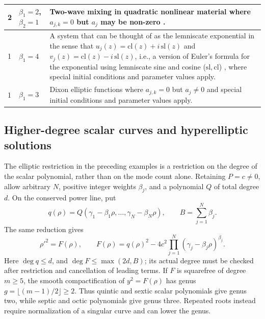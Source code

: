 \documentclass[11pt,a4paper]{article}
\numberwithin{equation}{section}
\begin{document}
\begin{center}
\begin{tabularx}{\textwidth}{|L{0.03\textwidth}|L{0.22\textwidth}|Y|}
         & $\beta_1=2$, $\beta_2=1$ & Two-wave mixing in quadratic nonlinear material where $a_{j,k}=0$ but $a_j$ may be non-zero \cite{heskethGeneralComplexEnvelope2015,armstrongInteractionsLightWaves1962}. \\
         & $\beta_1=4$& A system that can be thought of as the lemniscate exponential in the sense that $u_j(z)=\mathrm{cl}(z) + i\,\mathrm{sl}(z)$ and $v_j(z)=\mathrm{cl}(z) - i\,\mathrm{sl}(z)$, i.e., a version of Euler's formula for the exponential using lemniscate sine and cosine ($\mathrm{sl}, \mathrm{cl}$) \cite{whittakerCourseModernAnalysis2021}, where special initial conditions and parameter values apply. \\
         & $\beta_1=3$& Dixon elliptic functions \cite{zotero-item-852} where $a_{j,k}=0$ but $a_j\ne0$ and special initial conditions and parameter values apply. \\
        \hline
    \end{tabularx}
\end{center}

\subsection{Higher-degree scalar curves and hyperelliptic solutions}
\label{sec:hyperelliptic-examples}

The elliptic restriction in the preceding examples is a restriction on the degree of the scalar polynomial, rather than on the mode count alone. Retaining $P=c\ne0$, allow arbitrary $N$, positive integer weights $\beta_j$, and a polynomial $Q$ of total degree $d$. On the conserved power line, put
\begin{equation}
    q(\rho)=Q(\gamma_1-\beta_1\rho,\ldots,\gamma_N-\beta_N\rho),
    \qquad B=\sum_{j=1}^{N}\beta_j.
\end{equation}
The same reduction gives
\begin{equation}
    \rho'^2=F(\rho),\qquad
    F(\rho)=q(\rho)^2-4c^2\prod_{j=1}^{N}(\gamma_j-\beta_j\rho)^{\beta_j}.
    \label{eq:hyperelliptic-scalar-examples}
\end{equation}
Here $\deg q\le d$, and $\deg F\le\max(2d,B)$; its actual degree must be checked after restriction and cancellation of leading terms. If $F$ is squarefree of degree $m\ge5$, the smooth compactification of $y^2=F(\rho)$ has genus $g=\lfloor(m-1)/2\rfloor\ge2$. Thus quintic and sextic scalar polynomials give genus two, while septic and octic polynomials give genus three. Repeated roots instead require normalization of a singular curve and can lower the genus.
\end{document}

